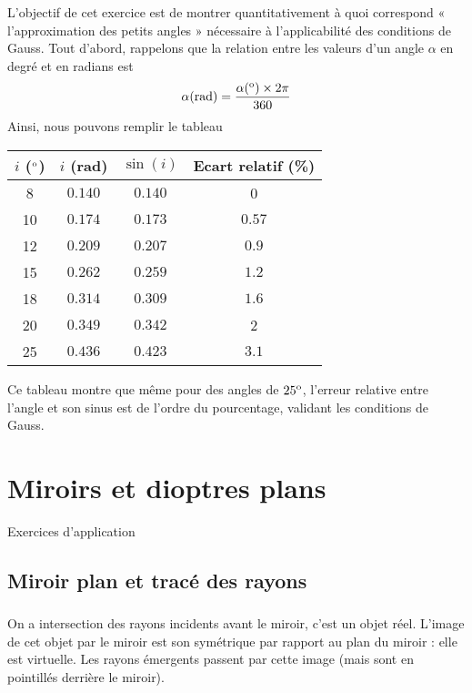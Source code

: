 \documentclass[10pt,a5paper,notitlepage]{book}
\begin{document}
L'objectif de cet exercice est de montrer quantitativement à quoi correspond
« l'approximation des petits angles » nécessaire à l'applicabilité des conditions
de Gauss. Tout d'abord, rappelons que la relation entre les valeurs d'un angle
$\alpha$ en degré et en radians est
\begin{equation}
	\alpha({\rm rad}) = \dfrac{\alpha(^{\rm o})\times 2\pi}{360}
\end{equation}
Ainsi, nous pouvons remplir le tableau
\begin{table*}[h!]
	\centering
	\begin{tabular}{|c|c|c|c|}
		\hline
		$i$ ($^{\rm o}$) & $i$ (rad) & $\sin(i)$ & Ecart relatif (\%) \\
		\hline
		8 & $0.140$ & $0.140$ & 0 \\
		\hline
		10 & $0.174$ & $0.173$ & $0.57$ \\
		\hline
		12 & $0.209$ & $0.207$ & $0.9$ \\
		\hline
		15 & $0.262$ & $0.259$ & $1.2$ \\
		\hline
		18 & $0.314$ & $0.309$ & $1.6$ \\
		\hline
		20 & $0.349$ & $0.342$ & 2 \\
		\hline
		25 & $0.436$ & $0.423$ & $3.1$ \\
		\hline
	\end{tabular}
\end{table*}
Ce tableau montre que même pour des angles de $25^{\rm o}$, l'erreur relative
entre l'angle et son sinus est de l'ordre du pourcentage, validant les
conditions de Gauss.

\theendnotes

\chapter{Miroirs et dioptres plans}
\vspace*{-47pt}
\begin{center}
    \Huge Exercices d'application
\end{center}

\section{Miroir plan et tracé des rayons}
\subsection{}
On a intersection des rayons incidents avant le miroir, c'est un objet réel.
L'image de cet objet par le miroir est son symétrique par rapport au plan du
miroir : elle est virtuelle. Les rayons émergents passent par cette image (mais
sont en pointillés derrière le miroir).
\end{document}
